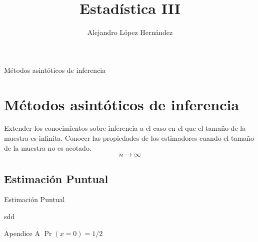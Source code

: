\documentclass{beamer}
\author[Alejandro López]{Alejandro López Hernández}
\institute[FES Acatlán UNAM ]
{ FES Acatlán\\
  Universidad Nacional Autónoma de México }
\title{Estadística III}
\begin{document}
\frame{\titlepage}
\frame{\tableofcontents}
\begin{frame}{Métodos asintóticos de inferencia}
\section{Métodos asintóticos de inferencia}
Extender los conocimientos sobre inferencia a el caso en el que el tamaño de la muestra es infinita. Conocer las propiedades de los estimadores cuando el tamaño de la muestra no es acotado.$$n\rightarrow \infty$$
\end{frame}
\subsection{Estimación Puntual}
\begin{frame}{Estimación Puntual}

sdd
\end{frame}
\appendix
\begin{frame}{Apendice A} 
$\Pr(x=0)=1/2$
\end{frame}
\end{document}

